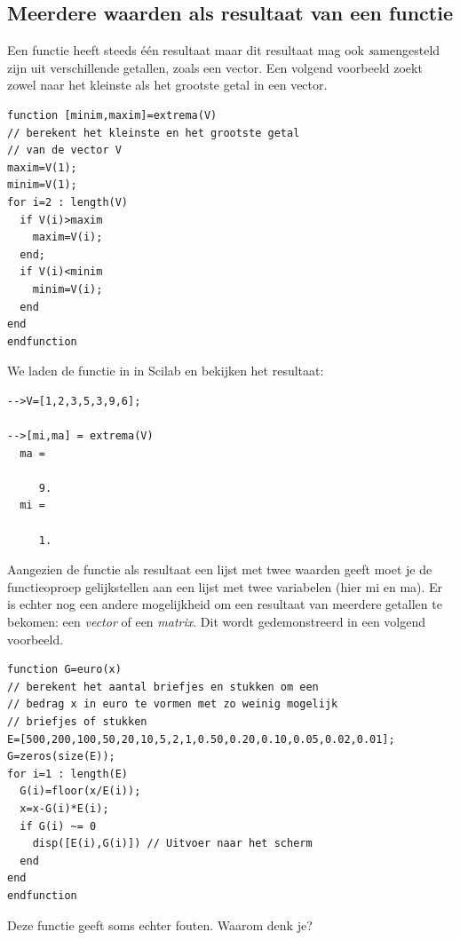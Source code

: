 \subsection{Meerdere waarden als resultaat van een functie}
Een functie heeft steeds \'e\'en resultaat maar dit resultaat mag ook \emph samengesteld zijn uit verschillende getallen, zoals een vector. Een volgend voorbeeld zoekt zowel naar het kleinste als het grootste getal in een vector.

\begin{lstlisting}[caption={Minimum en maximum van een vector}, label=minenmax]
function [minim,maxim]=extrema(V)
// berekent het kleinste en het grootste getal 
// van de vector V
maxim=V(1);
minim=V(1);
for i=2 : length(V)
  if V(i)>maxim
    maxim=V(i);
  end;
  if V(i)<minim
    minim=V(i);
  end
end
endfunction
\end{lstlisting}

We laden de functie in in Scilab en bekijken het resultaat:

\begin{lstlisting}[caption={Het minimum en maximum in het console venster}, label=minenmaxinscilex]
-->V=[1,2,3,5,3,9,6];

-->[mi,ma] = extrema(V)
  ma =
     
     9.
  mi =

     1.
\end{lstlisting}

Aangezien de functie als resultaat een lijst met twee waarden geeft moet je de functieoproep gelijkstellen aan een lijst met twee variabelen (hier mi en ma). Er is echter nog een andere mogelijkheid om een resultaat van meerdere getallen te bekomen: een \emph{vector} of een \emph{matrix}. Dit wordt gedemonstreerd in een volgend voorbeeld.

\begin{lstlisting}[caption={Functie euro(x)}, label=euro]
function G=euro(x)
// berekent het aantal briefjes en stukken om een
// bedrag x in euro te vormen met zo weinig mogelijk
// briefjes of stukken
E=[500,200,100,50,20,10,5,2,1,0.50,0.20,0.10,0.05,0.02,0.01];
G=zeros(size(E));
for i=1 : length(E)
  G(i)=floor(x/E(i));
  x=x-G(i)*E(i);
  if G(i) ~= 0
    disp([E(i),G(i)]) // Uitvoer naar het scherm
  end
end
endfunction
\end{lstlisting}

Deze functie geeft soms echter fouten. Waarom denk je?

%
